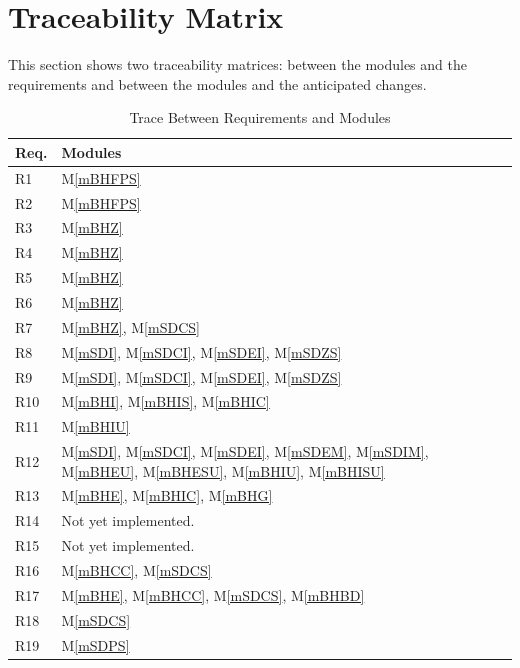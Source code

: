 \documentclass[12pt, titlepage]{article}
\newcommand{\mref}[1]{M\ref{#1}}
\begin{document}
\newpage
\section{Traceability Matrix} \label{SecTM}

This section shows two traceability matrices: between the modules and the
requirements and between the modules and the anticipated changes.

\begin{table}[H]
\centering
\begin{tabular}{p{} p{}}
\toprule
\textbf{Req.} & \textbf{Modules}\\
\midrule
R1 & \mref{mBHFPS}\\
R2 & \mref{mBHFPS} \\
R3 & \mref{mBHZ} \\
R4 & \mref{mBHZ}\\
R5 & \mref{mBHZ}\\
R6 & \mref{mBHZ} \\
R7 & \mref{mBHZ}, \mref{mSDCS} \\
R8 & \mref{mSDI}, \mref{mSDCI}, \mref{mSDEI}, \mref{mSDZS} \\
R9 &  \mref{mSDI}, \mref{mSDCI}, \mref{mSDEI}, \mref{mSDZS} \\
R10 & \mref{mBHI}, \mref{mBHIS},  \mref{mBHIC}  \\
R11 & \mref{mBHIU} \\
R12 & \mref{mSDI}, \mref{mSDCI}, \mref{mSDEI}, \mref{mSDEM}, \mref{mSDIM}, \mref{mBHEU}, \mref{mBHESU}, \mref{mBHIU}, \mref{mBHISU}\\
R13 & \mref{mBHE}, \mref{mBHIC}, \mref{mBHG}\\ 
R14 &  Not yet implemented.\\
R15 &  Not yet implemented.\\
R16 &  \mref{mBHCC}, \mref{mSDCS}\\
R17 &  \mref{mBHE}, \mref{mBHCC},  \mref{mSDCS},  \mref{mBHBD}\\ 
R18 &  \mref{mSDCS}\\
R19 &  \mref{mSDPS}\\
\bottomrule
\end{tabular}
\caption{Trace Between Requirements and Modules}
\label{TblRT}
\end{table}
\end{document}
